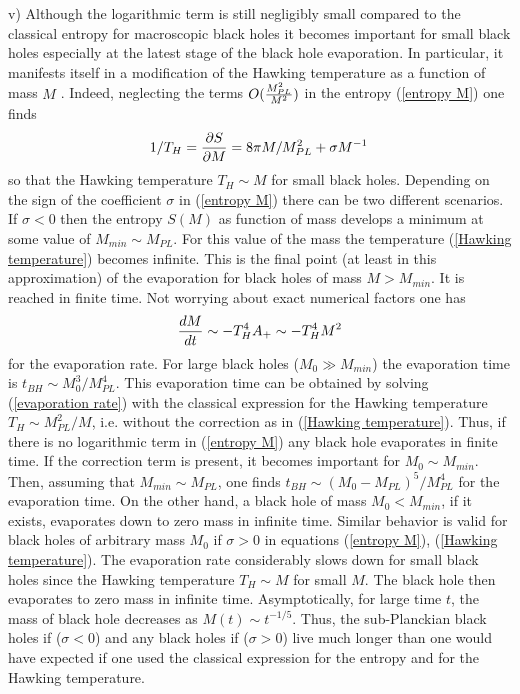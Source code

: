 \documentclass[12pt]{article}
\def\be{\begin{eqnarray}}
\def\ee{\end{eqnarray}}
\def\lb{\label}
\def\o{\over}
\begin{document}
\noindent v) Although the logarithmic term is still negligibly small compared to the classical entropy for  macroscopic black holes it becomes important 
for small black holes especially at the latest stage of the black hole evaporation.  In particular, it manifests itself in a modification of the Hawking temperature as a function of mass $M$  \cite{Fursaev:1994te}. Indeed,  neglecting the terms $O({M^2_{PL}\o M^2})$ in the entropy (\ref{entropy M}) one finds
\be
1/T_H={\partial S\o \partial M}=8\pi M/M^2_{PL}+\sigma M^{-1}\, 
\lb{Hawking temperature}
\ee
so that the Hawking temperature $T_H\sim M$ for small black holes. 
Depending on the sign of the coefficient $\sigma$ in (\ref{entropy M}) there can be two different scenarios.  If $\sigma<0$ then the entropy $S(M)$ as function of mass develops a minimum at some value of $M_{min}\sim M_{PL}$. For this value of the mass the temperature (\ref{Hawking temperature})  becomes infinite. This is the final point (at least in this approximation) of the evaporation for black holes of mass $M>M_{min}$. It is reached in finite time. Not worrying about exact numerical factors one has
\be
{dM\o dt}\sim -T_H^4 A_+\sim -T_H^4 M^2
\lb{evaporation rate}
\ee
for the evaporation rate. For large black holes ($M_0\gg M_{min}$) the evaporation time is  $t_{BH}\sim M_0^3/M^4_{PL}$. This  evaporation time can be  obtained by solving 
(\ref{evaporation rate}) with the classical expression for the Hawking temperature $T_H\sim M^2_{PL}/M$, i.e. without the correction as in (\ref{Hawking temperature}). Thus, if there is no logarithmic term in (\ref{entropy M}) any black hole evaporates in finite time.   If the correction term is present, it  becomes important for $M_0\sim M_{min}$. Then, assuming that $M_{min}\sim M_{PL}$, one finds  $t_{BH}\sim (M_0-M_{PL})^5/M^4_{PL}$ for the evaporation time. On the other hand, a black hole of   mass $M_0<M_{min}$, if it exists, evaporates down to zero mass in infinite time. Similar behavior is valid for black holes of arbitrary mass $M_0$  if $\sigma>0$ in equations (\ref{entropy M}), (\ref{Hawking temperature}). The evaporation rate considerably slows down for small black holes since the Hawking temperature $T_H\sim M$ for small $M$. The black hole then evaporates to zero mass in infinite time. Asymptotically, for large time $t$, the mass of black hole decreases as $M(t)\sim t^{-1/5}$. Thus, the sub-Planckian black holes if ($\sigma<0$) and any black holes
if ($\sigma>0$) live much longer than  one would have  expected if one used the classical expression for the entropy and for the Hawking temperature.
\end{document}
